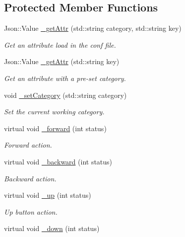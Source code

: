 \subsection*{Protected Member Functions}
\begin{DoxyCompactItemize}
\item 
Json\-::\-Value \hyperlink{class_characters_ace37d9664457f555a0009eb5f3b8b6b2}{\-\_\-get\-Attr} (std\-::string category, std\-::string key)
\begin{DoxyCompactList}\small\item\em Get an attribute load in the conf file. \end{DoxyCompactList}\item 
Json\-::\-Value \hyperlink{class_characters_abd51b12301a105d11021ac3302c742ea}{\-\_\-get\-Attr} (std\-::string key)
\begin{DoxyCompactList}\small\item\em Get an attribute with a pre-\/set category. \end{DoxyCompactList}\item 
void \hyperlink{class_characters_a9a06365f3881336e2ee8509129ec54cd}{\-\_\-set\-Category} (std\-::string category)
\begin{DoxyCompactList}\small\item\em Set the current working category. \end{DoxyCompactList}\item 
virtual void \hyperlink{class_characters_af8dca1980a447965ffeb2ea17a507c5c}{\-\_\-forward} (int status)
\begin{DoxyCompactList}\small\item\em Forward action. \end{DoxyCompactList}\item 
virtual void \hyperlink{class_characters_ab5b3e9e9140665e9e358343d9b47ea1c}{\-\_\-backward} (int status)
\begin{DoxyCompactList}\small\item\em Backward action. \end{DoxyCompactList}\item 
virtual void \hyperlink{class_characters_a2bb63a2db8990e516cc2424f1dbf713a}{\-\_\-up} (int status)
\begin{DoxyCompactList}\small\item\em Up button action. \end{DoxyCompactList}\item 
virtual void \hyperlink{class_characters_a3253373f4bf97f623de6d758b464b553}{\-\_\-down} (int status)

\end{DoxyCompactItemize}
